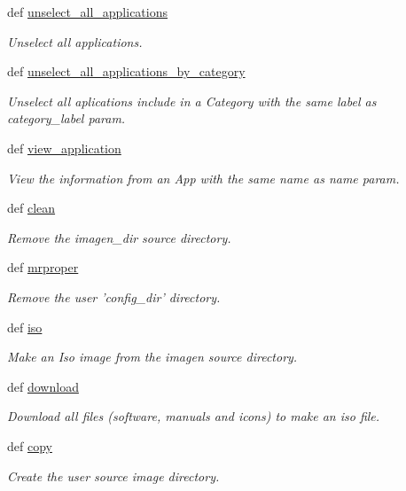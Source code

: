 \begin{CompactItemize}
def \hyperlink{classwinsol_1_1WinSOL_251d306446f4bae66790d579da69db8c}{unselect\_\-all\_\-applications}
\begin{CompactList}\small\item\em Unselect all applications. \item\end{CompactList}\item 
def \hyperlink{classwinsol_1_1WinSOL_94e732a8185923ac882e98a457aa124e}{unselect\_\-all\_\-applications\_\-by\_\-category}
\begin{CompactList}\small\item\em Unselect all aplications include in a Category with the same label as {\em category\_\-label\/} param. \item\end{CompactList}\item 
def \hyperlink{classwinsol_1_1WinSOL_381a6ab6e375c75dee6e42a631754745}{view\_\-application}
\begin{CompactList}\small\item\em View the information from an App with the same name as {\em name\/} param. \item\end{CompactList}\item 
def \hyperlink{classwinsol_1_1WinSOL_89a40fdffa62401f36b6cc273224dea2}{clean}
\begin{CompactList}\small\item\em Remove the {\em imagen\_\-dir\/} source directory. \item\end{CompactList}\item 
def \hyperlink{classwinsol_1_1WinSOL_0653c756ac4ef940d1d79cd85cd525e5}{mrproper}
\begin{CompactList}\small\item\em Remove the user 'config\_\-dir' directory. \item\end{CompactList}\item 
def \hyperlink{classwinsol_1_1WinSOL_7c66ff1af7209463859a779e0d21e898}{iso}
\begin{CompactList}\small\item\em Make an Iso image from the imagen source directory. \item\end{CompactList}\item 
def \hyperlink{classwinsol_1_1WinSOL_978c4164171d6201aec2131ec4c57279}{download}
\begin{CompactList}\small\item\em Download all files (software, manuals and icons) to make an iso file. \item\end{CompactList}\item 
def \hyperlink{classwinsol_1_1WinSOL_0b0ba2df6d422e7c6ab5ef4c97050f3f}{copy}
\begin{CompactList}\small\item\em Create the user source image directory. \item\end{CompactList}\end{CompactItemize}

